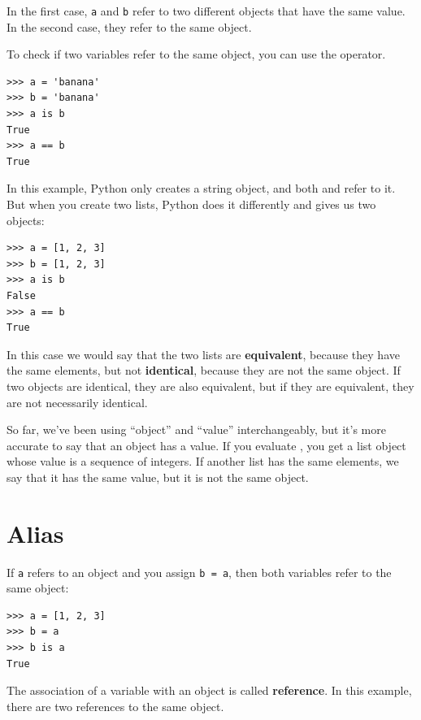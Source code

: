 In the first case, \texttt{a} and \texttt{b} refer to two different objects that have the same value. In the second case, they refer to the same object.

To check if two variables refer to the same object, you can use the  operator.

\begin{Verbatim}[frame=single]
>>> a = 'banana'
>>> b = 'banana'
>>> a is b
True
>>> a == b
True
\end{Verbatim}
%
In this example, Python only creates a string object, and both  and  refer to it. But when you create two lists, Python does it differently and gives us two objects:

\begin{Verbatim}[frame=single]
>>> a = [1, 2, 3]
>>> b = [1, 2, 3]
>>> a is b
False
>>> a == b 
True
\end{Verbatim}
%


In this case we would say that the two lists are \textbf{equivalent}, because they have the same elements, but not \textbf{identical}, because they are not the same object. If two objects are identical, they are also equivalent, but if they are equivalent, they are not necessarily identical.

So far, we've been using ``object'' and ``value'' interchangeably, but it's more accurate to say that an object has a value. If you evaluate \pythoninline{[1, 2, 3]}, you get a list object whose value is a sequence of integers. If another list has the same elements, we say that it has the same value, but it is not the same object.


\section{Alias}

If \texttt{a} refers to an object and you assign \texttt{b = a}, then both variables refer to the same object:

\begin{Verbatim}[frame=single]
>>> a = [1, 2, 3]
>>> b = a
>>> b is a
True
\end{Verbatim}
%

The association of a variable with an object is called \textbf{reference}. In this example, there are two references to the same object.

